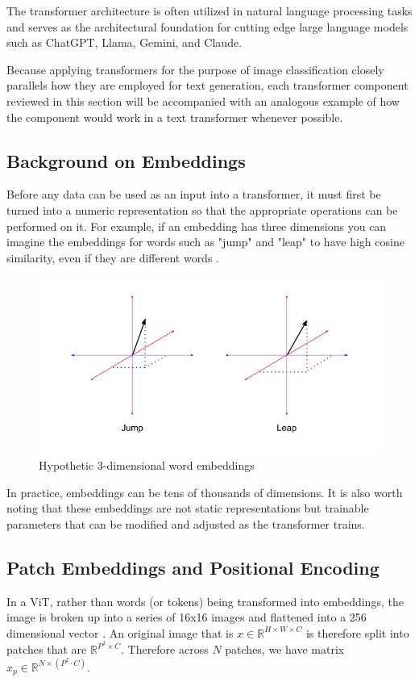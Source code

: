 \documentclass [MAS] {uclathes}
\begin{document}
The transformer architecture is often utilized in natural language processing tasks and serves as the 
architectural foundation for cutting edge large language models such as ChatGPT, Llama, Gemini, and Claude. 

Because applying transformers for the purpose of image classification closely parallels how they are employed for text
generation, each transformer component reviewed in this section will be accompanied with an analogous example of how the
component would work in a text transformer whenever possible.

\subsection{Background on Embeddings}
Before any data can be used as an input into a transformer, it must first be turned into a numeric representation so 
that the appropriate operations can be performed on it. For example, if an embedding has three dimensions you can 
imagine the embeddings for words such as "jump" and "leap" to have high cosine similarity, even if they are different 
words \cite{deeplearningbook}.

\begin{figure} [H]
    \centering
    \includegraphics[width=1\linewidth]{figures/Cosine Similarity Example.jpg}
    \caption{Hypothetic 3-dimensional word embeddings}
\end{figure}

In practice, embeddings can be tens of thousands of dimensions. It is also worth noting that these embeddings are not 
static representations but trainable parameters that can be modified and adjusted as the transformer trains. 

\subsection{Patch Embeddings and Positional Encoding}
In a ViT, rather than words (or tokens) being transformed into embeddings, the image is broken up into a series of 16x16
images and flattened into a 256 dimensional vector \cite{vit}. An original image that is \(x \in \mathbb{R}^{H \times W \times C}\)
is therefore split into patches that are  \(\mathbb{R}^{P^2 \times C}\). Therefore across \(N\) patches, we have matrix
\(x_p \in \mathbb{R}^{N \times (P^2 \cdot C)}\).
\end{document}
